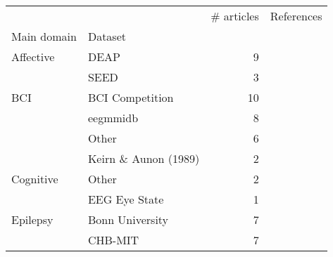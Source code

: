 \begin{tabular}{llrl}
\toprule
      &       &  \# articles &                                                                                                                         References \\
Main domain & Dataset &              &                                                                                                                                    \\
\midrule
Affective & DEAP &            9 &                   \cite{Li2018, Alhagry2017, BenSaid2017a, Lin2017, Xu2016, Liu2016, Frydenlund2015, Jirayucharoensak2014, Li2013} \\
      & SEED &            3 &                                                                                               \cite{Zhang2018, Liu2016, Zheng2015} \\
BCI & BCI Competition &           10 &  \cite{Gao2018, Lawhern2018, Sakhavi2017, Schirrmeister2017, Tabar2016a, Manor2015, Sakhavi2015, Yang2015a, Ding2015, Cecotti2011} \\
      & eegmmidb &            8 &                           \cite{Zhang2018c, Zhang2017g, Major2017, Zhang2017d, Zhang2017a, Dharamsi2017, Normand2015, Alomari2013} \\
      & Other &            6 &                                                 \cite{Hasib2018, Lawhern2018, Schirrmeister2017, Hajinoroozi2017, Sun2016, An2016} \\
      & Keirn \& Aunon (1989) &            2 &                                                                                                  \cite{Padmanabh2017, Patnaik2017} \\
Cognitive & Other &            2 &                                                                                                 \cite{Kuanar2018, Hajinoroozi2015} \\
      & EEG Eye State &            1 &                                                                                                                  \cite{Narejo2016} \\
Epilepsy & Bonn University &            7 &                        \cite{Hussein2018, Ullah2018, Ahmedt-Aristizabal2018, Talathi2017, Acharya2017, Omerhodzic2013, Naderi2010} \\
      & CHB-MIT &            7 &                                       \cite{Tsiouris2018, Yuan2018a, Truong2018, Truong2018a, Page2016, Thodoroff2016, Turner2014} \\

\end{tabular}
